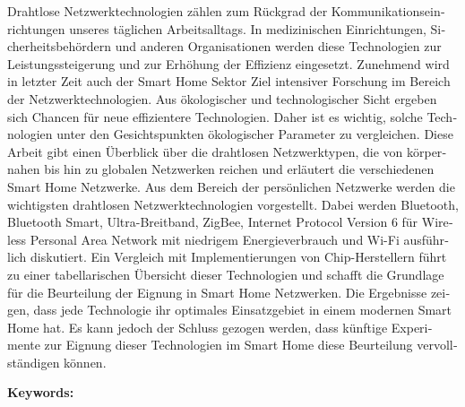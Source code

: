 \documentclass[
  headexclude,
  footexclude,
  10pt,
  a4paper,
  oneside,
  captions=tableheading,
  bibliography=totoc,
  listof=totoc
]{scrbook}
\newenvironment{bibhyphenation}
{\hyphenpenalty=20
  \tolerance=9999
  \exhyphenpenalty=0
  \linepenalty=0
  \setlength{\emergencystretch}{3em}}
{}
\begin{document}
\begin{otherlanguage}{austrian}
Drahtlose Netzwerktechnologien zählen zum Rückgrad der Kommunikationseinrichtungen unseres täglichen Arbeitsalltags. In medizinischen Einrichtungen, Sicherheitsbehördern und anderen Organisationen werden diese Technologien zur Leistungssteigerung und zur Erhöhung der Effizienz eingesetzt. Zunehmend wird in letzter Zeit auch der Smart Home Sektor Ziel intensiver Forschung im Bereich der Netzwerktechnologien. Aus ökologischer und technologischer Sicht ergeben sich Chancen für neue effizientere Technologien. Daher ist es wichtig, solche Technologien unter den Gesichtspunkten ökologischer Parameter zu vergleichen. Diese Arbeit gibt einen Überblick über die drahtlosen Netzwerktypen, die von körpernahen bis hin zu globalen Netzwerken reichen und erläutert die verschiedenen Smart Home Netzwerke. Aus dem Bereich der persönlichen Netzwerke werden die wichtigsten drahtlosen Netzwerktechnologien vorgestellt. Dabei werden Bluetooth, Bluetooth Smart, Ultra-Breitband, ZigBee, Internet Protocol Version 6 für Wireless Personal Area Network mit niedrigem Energieverbrauch und Wi-Fi ausführlich diskutiert. Ein Vergleich mit Implementierungen von Chip-Herstellern führt zu einer tabellarischen Übersicht dieser Technologien und schafft die Grundlage für die Beurteilung der Eignung in Smart Home Netzwerken. Die Ergebnisse zeigen, dass jede Technologie ihr optimales Einsatzgebiet in einem modernen Smart Home hat. Es kann jedoch der Schluss gezogen werden, dass künftige Experimente zur Eignung dieser Technologien im Smart Home diese Beurteilung vervollständigen können.
\end{otherlanguage}

\vspace{2cm}

\textbf{Keywords:} \campusKeywords

\mainmatter

\setcounter{page}{1}

\pagestyle{scrheadings}
\setlength{\parindent}{0em}
\renewcommand*{\chapterpagestyle}{scrheadings}

\tableofcontents

\clearpage

\setcounter{page}{1}










\clearpage

\printbibheading[heading=bibintoc, title=References]
\begin{bibhyphenation}
  \printbibliography[heading=subbibintoc, title=Bibliography, filter={printed}]
  \printbibliography[heading=subbibintoc, title=Webography, filter={online}]
\end{bibhyphenation}

\clearpage

\ihead[]{\leftmark}
\listoffigures
\listoftables
\printglossary[type=\acronymtype]
\end{document}

